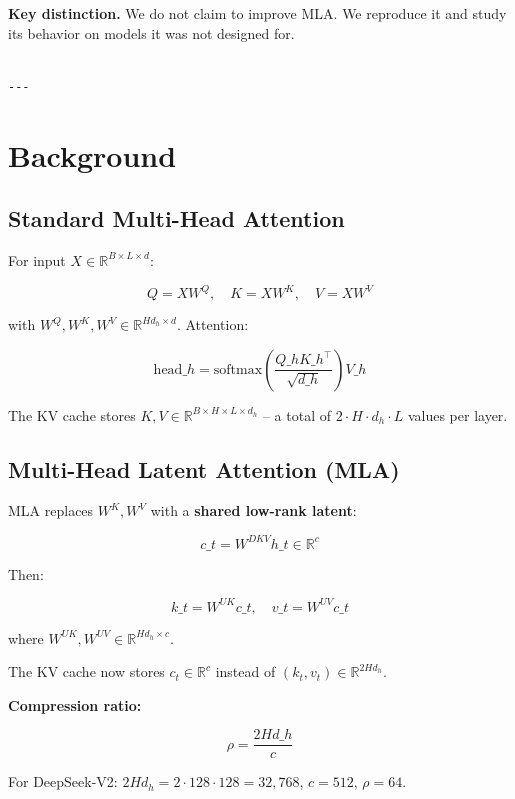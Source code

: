 \textbf{Key distinction.} We do not claim to improve MLA. We reproduce it and 
study its behavior on models it was not designed for.
\begin{lstlisting}

---
\end{lstlisting}


\section{Background}

\subsection{Standard Multi-Head Attention}

For input $X \in \mathbb{R}^{B \times L \times d}$:

\[
Q = X W^Q, \quad K = X W^K, \quad V = X W^V
\tag{3.1}
\]

with $W^Q, W^K, W^V \in \mathbb{R}^{H d_h \times d}$. Attention:

\[
\text{head}\_h = \text{softmax}\!\left(\frac{Q\_h K\_h^\top}{\sqrt{d\_h}}\right) V\_h
\tag{3.2}
\]

The KV cache stores $K, V \in \mathbb{R}^{B \times H \times L \times d_h}$ -- 
a total of $2 \cdot H \cdot d_h \cdot L$ values per layer.

\subsection{Multi-Head Latent Attention (MLA)}

MLA replaces $W^K, W^V$ with a \textbf{shared low-rank latent}:

\[
c\_t = W^{DKV} h\_t \in \mathbb{R}^c
\tag{3.3}
\]

Then:

\[
k\_t = W^{UK} c\_t, \quad v\_t = W^{UV} c\_t
\tag{3.4}
\]

where $W^{UK}, W^{UV} \in \mathbb{R}^{H d_h \times c}$.

The KV cache now stores $c_t \in \mathbb{R}^c$ instead of $(k_t, v_t) \in \mathbb{R}^{2 H d_h}$.

\textbf{Compression ratio:}

\[
\rho = \frac{2 H d\_h}{c}
\tag{3.5}
\]

For DeepSeek-V2: $2 H d_h = 2 \cdot 128 \cdot 128 = 32{,}768$, $c = 512$, 
$\rho = 64$.

